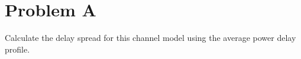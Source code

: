 \section{Problem A}
Calculate the delay spread for this channel model using the average power delay profile.